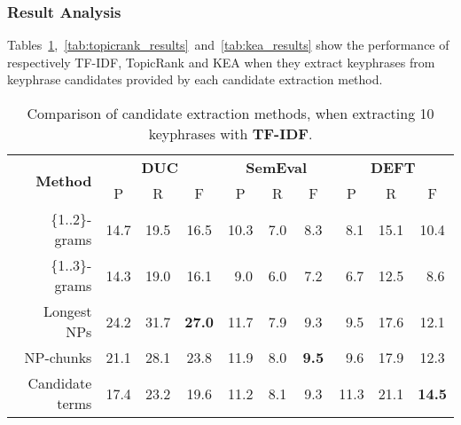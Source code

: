     \subsubsection{Result Analysis}
    \label{subsubsec:candidate_extraction_result_analysis}
      Tables~\ref{tab:tfidf_results},~\ref{tab:topicrank_results}~and~\ref{tab:kea_results}
      show the performance of respectively TF-IDF, TopicRank and KEA when
      they extract keyphrases from keyphrase candidates provided by each
      candidate extraction method.
      \begin{table}
        \centering
        \begin{tabular}{rccccccccc}
          \toprule
          \multirow{2}{*}[-2pt]{\textbf{Method}} & \multicolumn{3}{c}{\textbf{DUC}} & \multicolumn{3}{c}{\textbf{SemEval}} & \multicolumn{3}{c}{\textbf{DEFT}}\\
          \cmidrule(r){2-4}\cmidrule(lr){5-7}\cmidrule(l){8-10}
          & P & R & F & P & R & F & P & R & F\\
          \midrule
          \{1..2\}-grams & 14.7 & 19.5 & 16.5 & 10.3 & $~~$7.0 & $~~$8.3 & $~~$8.1 & 15.1 & 10.4\\
          \{1..3\}-grams & 14.3 & 19.0 & 16.1 & $~~$9.0 & $~~$6.0 & $~~$7.2 & $~~$6.7 & 12.5 & $~~$8.6\\
          Longest NPs & 24.2 & 31.7 & \textbf{27.0} & 11.7 & $~~$7.9 & $~~$9.3 & $~~$9.5 & 17.6 & 12.1\\
          NP-chunks & 21.1 & 28.1 & 23.8 & 11.9 & $~~$8.0 & \textbf{$~~$9.5} & $~~$9.6 & 17.9 & 12.3\\
          Candidate terms & 17.4 & 23.2 & 19.6 & 11.2 & $~~$8.1 & $~~$9.3 & 11.3 & 21.1 & \textbf{14.5}\\
          \bottomrule
        \end{tabular}
        \caption{Comparison of candidate extraction methods, when extracting 10
                 keyphrases with \textbf{TF-IDF}.
                 \label{tab:tfidf_results}}
      \end{table}
